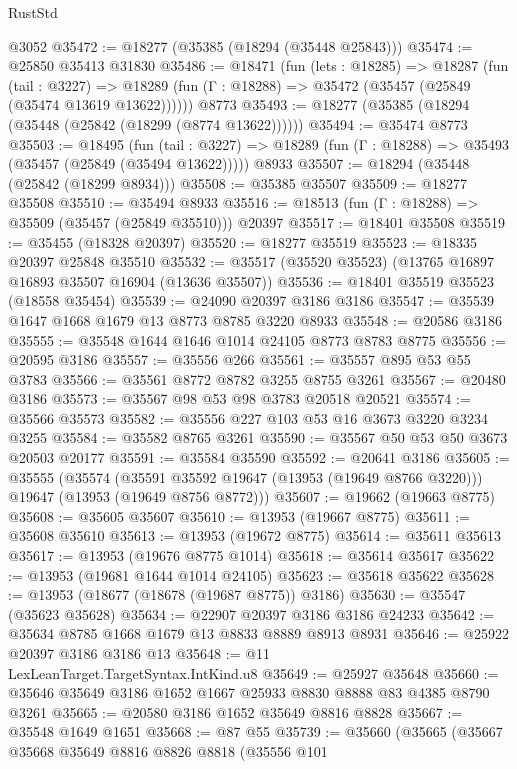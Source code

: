 \begin{lexlean}{RustStd}
\begin{coremodule}
    @3052
@35472 := @18277 (@35385 (@18294 (@35448 @25843)))
@35474 := @25850 @35413 @31830
@35486 := @18471
    (fun (lets : @18285) =>
    @18287
      (fun (tail : @3227) =>
      @18289 (fun (Γ : @18288) => @35472 (@35457 (@25849 (@35474 @13619 @13622))))))
    @8773
@35493 := @18277 (@35385 (@18294 (@35448 (@25842 (@18299 (@8774 @13622))))))
@35494 := @35474 @8773
@35503 := @18495
    (fun (tail : @3227) => @18289 (fun (Γ : @18288) => @35493 (@35457 (@25849 (@35494 @13622)))))
    @8933
@35507 := @18294 (@35448 (@25842 (@18299 @8934)))
@35508 := @35385 @35507
@35509 := @18277 @35508
@35510 := @35494 @8933
@35516 := @18513 (fun (Γ : @18288) => @35509 (@35457 (@25849 @35510))) @20397
@35517 := @18401 @35508
@35519 := @35455 (@18328 @20397)
@35520 := @18277 @35519
@35523 := @18335 @20397 @25848 @35510
@35532 := @35517 (@35520 @35523) (@13765 @16897 @16893 @35507 @16904 (@13636 @35507))
@35536 := @18401 @35519 @35523 (@18558 @35454)
@35539 := @24090 @20397 @3186 @3186
@35547 := @35539 @1647 @1668 @1679 @13 @8773 @8785 @3220 @8933
@35548 := @20586 @3186
@35555 := @35548 @1644 @1646 @1014 @24105 @8773 @8783 @8775
@35556 := @20595 @3186
@35557 := @35556 @266
@35561 := @35557 @895 @53 @55 @3783
@35566 := @35561 @8772 @8782 @3255 @8755 @3261
@35567 := @20480 @3186
@35573 := @35567 @98 @53 @98 @3783 @20518 @20521
@35574 := @35566 @35573
@35582 := @35556 @227 @103 @53 @16 @3673 @3220 @3234 @3255
@35584 := @35582 @8765 @3261
@35590 := @35567 @50 @53 @50 @3673 @20503 @20177
@35591 := @35584 @35590
@35592 := @20641 @3186
@35605 := @35555
    (@35574
      (@35591 @35592 @19647 (@13953 (@19649 @8766 @3220)))
      @19647
      (@13953 (@19649 @8756 @8772)))
@35607 := @19662 (@19663 @8775)
@35608 := @35605 @35607
@35610 := @13953 (@19667 @8775)
@35611 := @35608 @35610
@35613 := @13953 (@19672 @8775)
@35614 := @35611 @35613
@35617 := @13953 (@19676 @8775 @1014)
@35618 := @35614 @35617
@35622 := @13953 (@19681 @1644 @1014 @24105)
@35623 := @35618 @35622
@35628 := @13953 (@18677 (@18678 (@19687 @8775)) @3186)
@35630 := @35547 (@35623 @35628)
@35634 := @22907 @20397 @3186 @3186 @24233
@35642 := @35634 @8785 @1668 @1679 @13 @8833 @8889 @8913 @8931
@35646 := @25922 @20397 @3186 @3186 @13
@35648 := @11 LexLeanTarget.TargetSyntax.IntKind.u8
@35649 := @25927 @35648
@35660 := @35646 @35649 @3186 @1652 @1667 @25933 @8830 @8888 @83 @4385 @8790 @3261
@35665 := @20580 @3186 @1652 @35649 @8816 @8828
@35667 := @35548 @1649 @1651
@35668 := @87 @55
@35739 := @35660
    (@35665
      (@35667
        @35668
        @35649
        @8816
        @8826
        @8818
        (@35556
          @101

\end{coremodule}
\end{lexlean}
